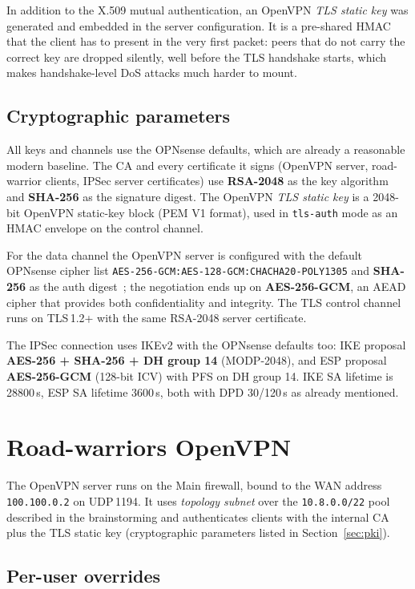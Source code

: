 \documentclass[twocolumn]{NobArticle}
\begin{document}
In addition to the X.509 mutual authentication, an OpenVPN
\textit{TLS static key} was generated and embedded in the server
configuration. It is a pre-shared HMAC that the client has to present in
the very first packet: peers that do not carry the correct key are
dropped silently, well before the TLS handshake starts, which makes
handshake-level DoS attacks much harder to mount.

\subsection{Cryptographic parameters}

All keys and channels use the OPNsense defaults, which are already a
reasonable modern baseline. The CA and every certificate it signs
(OpenVPN server, road-warrior clients, IPSec server certificates) use
\textbf{RSA-2048} as the key algorithm and \textbf{SHA-256} as the
signature digest. The OpenVPN \textit{TLS static key} is a 2048-bit
OpenVPN static-key block (PEM V1 format), used in \texttt{tls-auth}
mode as an HMAC envelope on the control channel.

For the data channel the OpenVPN server is configured with the default
OPNsense cipher list \texttt{AES-256-GCM:AES-128-GCM:CHACHA20-POLY1305}
and \textbf{SHA-256} as the auth digest~\cite{openvpn}; the negotiation
ends up on \textbf{AES-256-GCM}, an AEAD cipher that provides both
confidentiality and integrity. The TLS control channel runs on TLS\,1.2+
with the same RSA-2048 server certificate.

The IPSec connection uses IKEv2 with the OPNsense defaults too: IKE
proposal \textbf{AES-256 + SHA-256 + DH group 14} (MODP-2048), and ESP
proposal \textbf{AES-256-GCM} (128-bit ICV) with PFS on DH group 14.
IKE SA lifetime is 28800\,s, ESP SA lifetime 3600\,s, both with DPD
30/120\,s as already mentioned.

\section{Road-warriors OpenVPN}

The OpenVPN server runs on the Main firewall, bound to the WAN address
\texttt{100.100.0.2} on UDP\,1194. It uses \textit{topology subnet} over
the \texttt{10.8.0.0/22} pool described in the brainstorming and
authenticates clients with the internal CA plus the TLS static key
(cryptographic parameters listed in Section~\ref{sec:pki}).

\subsection{Per-user overrides}
\end{document}
